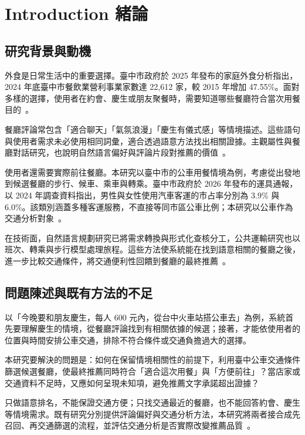 
\chapter{Introduction 緒論}

\section{研究背景與動機}

外食是日常生活中的重要選擇。臺中市政府於 2025 年發布的家庭外食分析指出，2024 年底臺中市餐飲業營利事業家數達 22,612 家，較 2015 年增加 47.55\%。面對多樣的選擇，使用者在約會、慶生或朋友聚餐時，需要知道哪些餐廳符合當次用餐目的~\cite{taichung_eat_outside}。

餐廳評論常包含「適合聊天」「氣氛浪漫」「慶生有儀式感」等情境描述。這些語句與使用者需求未必使用相同詞彙，適合透過語意方法找出相關證據。主觀屬性與餐廳對話研究，也說明自然語言偏好與評論片段對推薦的價值~\cite{subjective_attributes,critique_preference}。

使用者還需要實際前往餐廳。本研究以臺中市的公車用餐情境為例，考慮從出發地到候選餐廳的步行、候車、乘車與轉乘。臺中市政府於 2026 年發布的運具通報，以 2024 年調查資料指出，男性與女性使用汽車客運的市占率分別為 3.9\% 與 6.0\%。該類別涵蓋多種客運服務，不直接等同市區公車比例；本研究以公車作為交通分析對象~\cite{taichung_gender}。

在技術面，自然語言規劃研究已將需求轉換與形式化查核分工，公共運輸研究也以班次、轉乘與步行模型處理旅程。這些方法使系統能在找到語意相關的餐廳之後，進一步比較交通條件，將交通便利性回饋到餐廳的最終推薦~\cite{llm_planning_tools,bus_dynamic_replanning}。

\section{問題陳述與既有方法的不足}

以「今晚要和朋友慶生，每人 600 元內，從台中火車站搭公車去」為例，系統首先要理解慶生的情境，從餐廳評論找到有相關依據的候選；接著，才能依使用者的位置與時間安排公車交通，排除不符合條件或交通負擔過大的選擇。

本研究要解決的問題是：如何在保留情境相關性的前提下，利用臺中公車交通條件篩選候選餐廳，使最終推薦同時符合「適合這次用餐」與「方便前往」？當店家或交通資料不足時，又應如何呈現未知項，避免推薦文字承諾超出證據？

只做語意排名，不能保證交通方便；只找交通最近的餐廳，也不能回答約會、慶生等情境需求。既有研究分別提供評論偏好與交通分析方法，本研究將兩者接合成先召回、再交通篩選的流程，並評估交通分析是否實際改變推薦品質~\cite{critique_preference,bus_dynamic_replanning}。

